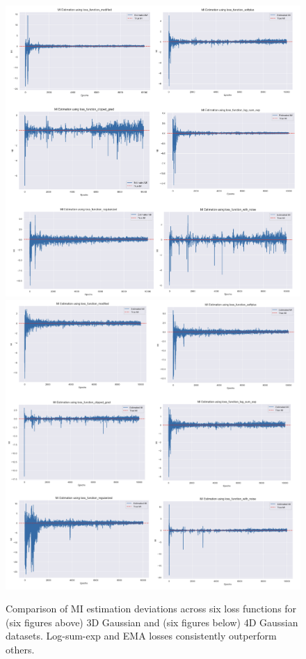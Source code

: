 \documentclass[lettersize,journal]{IEEEtran}
\begin{document}
\begin{figure}[h]
    \centering
    \includegraphics[width=1\linewidth]{figures/3d_loss_comparisons.png}
    \includegraphics[width=1\linewidth]{figures/4d_loss_comparisons.png}
    \caption{Comparison of MI estimation deviations across six loss functions for (six figures above) 3D Gaussian and (six figures below) 4D Gaussian datasets. Log-sum-exp and EMA losses consistently outperform others.}
    \label{fig:loss_comparisons}
\end{figure}
\end{document}
